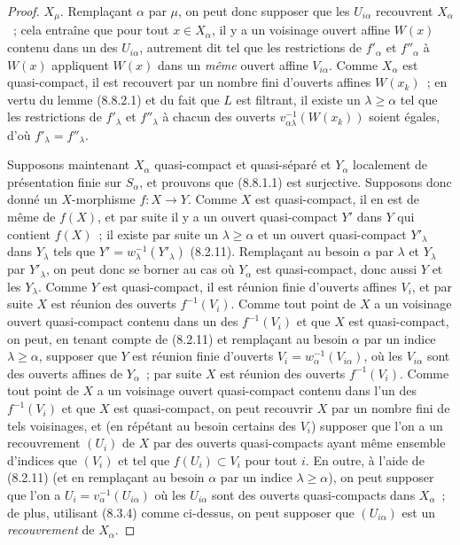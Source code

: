 \begin{proof}
$X_\mu$. Remplaçant $\alpha$ par $\mu$, on peut donc supposer que les
$U_{i\alpha}$ recouvrent $X_\alpha$~; cela entraîne que pour tout
$x\in X_\alpha$, il y a un voisinage ouvert affine $W(x)$ contenu dans un des
$U_{i\alpha}$, autrement dit tel que les restrictions de $f'_\alpha$ et
$f''_\alpha$ à $W(x)$ appliquent $W(x)$ dans un \emph{même} ouvert affine
$V_{i\alpha}$. Comme $X_\alpha$ est quasi-compact, il est recouvert par un
nombre fini d'ouverts affines $W(x_k)$~; en vertu du lemme (8.8.2.1) et du fait
que $L$ est filtrant, il existe un $\lambda\geq\alpha$ tel que les
restrictions de $f'_\lambda$ et $f''_\lambda$ à chacun des ouverts
$v_{\alpha\lambda}^{-1}(W(x_k))$ soient égales, d'où
$f'_\lambda=f''_\lambda$.

Supposons maintenant $X_\alpha$ quasi-compact et quasi-séparé et $Y_\alpha$
localement de présentation finie sur $S_\alpha$, et prouvons que (8.8.1.1) est
surjective. Supposons donc donné un $X$-morphisme $f:X\to Y$. Comme $X$ est
quasi-compact, il en est de même
de $f(X)$, et par suite il y a un ouvert quasi-compact $Y'$ dans $Y$ qui
contient $f(X)$~; il existe par suite un $\lambda\geq\alpha$ et un ouvert
quasi-compact $Y'_\lambda$ dans $Y_\lambda$ tels que
$Y'=w_\lambda^{-1}(Y'_\lambda)$ (8.2.11). Remplaçant au besoin $\alpha$ par
$\lambda$ et $Y_\lambda$ par $Y'_\lambda$, on peut donc se borner au cas où
$Y_\alpha$ est quasi-compact, donc aussi $Y$ et les $Y_\lambda$. Comme $Y$ est
quasi-compact, il est réunion finie d'ouverts affines $V_i$, et par suite $X$
est réunion des ouverts $f^{-1}(V_i)$. Comme tout point de $X$ a un voisinage
ouvert quasi-compact contenu dans un des $f^{-1}(V_i)$ et que $X$ est
quasi-compact, on peut, en tenant compte de (8.2.11) et remplaçant au besoin
$\alpha$ par un indice $\lambda\geq\alpha$, supposer que $Y$ est réunion finie
d'ouverts $V_i=w_\alpha^{-1}(V_{i\alpha})$, où les $V_{i\alpha}$ sont des
ouverts affines de $Y_\alpha$~; par suite $X$ est réunion des ouverts
$f^{-1}(V_i)$. Comme tout point de $X$ a un voisinage ouvert quasi-compact
contenu dans l'un des $f^{-1}(V_i)$ et que $X$ est quasi-compact, on peut
recouvrir $X$ par un nombre fini de tels voisinages, et (en répétant au besoin
certains des $V_i$) supposer que l'on a un recouvrement $(U_i)$ de $X$ par des
ouverts quasi-compacts ayant même ensemble d'indices que $(V_i)$ et tel que
$f(U_i)\subset V_i$ pour tout $i$. En outre, à l'aide de (8.2.11) (et en
remplaçant au besoin $\alpha$ par un indice $\lambda\geq\alpha$), on peut
supposer que l'on a $U_i=v_\alpha^{-1}(U_{i\alpha})$ où les $U_{i\alpha}$ sont
des ouverts quasi-compacts dans $X_\alpha$~; de plus, utilisant (8.3.4) comme
ci-dessus, on peut supposer que $(U_{i\alpha})$ est un \emph{recouvrement} de
$X_\alpha$.


\end{proof}
